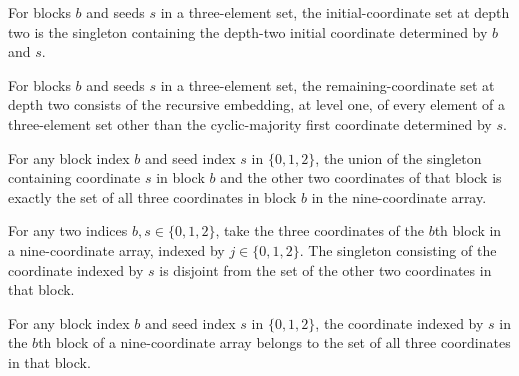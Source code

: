 \begin{definition}
\label{FABL.depthTwoInitialCoordinates}
\leanok
{}
For blocks $b$ and seeds $s$ in a three-element set, the initial-coordinate set at depth
two is the singleton containing the depth-two initial coordinate determined by $b$ and
$s$.
\end{definition}

\begin{definition}
\label{FABL.depthTwoRemainingCoordinates}
\leanok
{}
For blocks $b$ and seeds $s$ in a three-element set, the remaining-coordinate set at
depth two consists of the recursive embedding, at level one, of every element of a
three-element set other than the cyclic-majority first coordinate determined by $s$.
\end{definition}

\begin{theorem}
\label{FABL.depthTwoInitial_union_remaining}
\leanok
{}
For any block index $b$ and seed index $s$ in $\{0,1,2\}$, the union of the singleton
containing coordinate $s$ in block $b$ and the other two coordinates of that block is
exactly the set of all three coordinates in block $b$ in the nine-coordinate array.
\end{theorem}

\begin{theorem}
\label{FABL.depthTwoInitial_remaining_disjoint}
\leanok
{}
For any two indices $b,s\in\{0,1,2\}$, take the three coordinates of the $b$th block in
a nine-coordinate array, indexed by $j\in\{0,1,2\}$. The singleton consisting of the
coordinate indexed by $s$ is disjoint from the set of the other two coordinates in that
block.
\end{theorem}

\begin{theorem}
\label{FABL.depthTwoInitial_subset_block}
\leanok
{}
For any block index $b$ and seed index $s$ in $\{0,1,2\}$, the coordinate indexed by $s$
in the $b$th block of a nine-coordinate array belongs to the set of all three
coordinates in that block.
\end{theorem}

